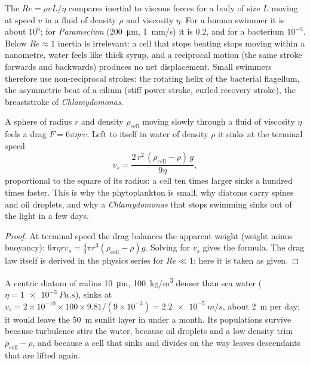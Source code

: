 \begin{proposition}\label{prop:b2:unicellular-diversity:reynolds}
The \emph{} $Re = \rho v L/\eta$ compares inertial to
viscous forces for a body of size $L$ moving at speed $v$ in a fluid
of density $\rho$ and viscosity $\eta$. For a human swimmer it is
about $10^6$; for \emph{Paramecium} (\qty{200}{\micro m},
\qty{1}{mm/s}) it is 0.2, and for a bacterium $10^{-5}$. Below
$Re \approx 1$ inertia is irrelevant: a cell that stops beating
stops moving within a nanometre, water feels like thick syrup, and a
reciprocal motion (the same stroke forwards and backwards) produces
no net displacement. Small swimmers therefore use non-reciprocal
strokes: the rotating helix of the bacterial flagellum, the
asymmetric beat of a cilium (stiff power stroke, curled recovery
stroke), the breaststroke of \emph{Chlamydomonas}.
\end{proposition}

\begin{theorem}\label{thm:b2:unicellular-diversity:stokes}
A sphere of radius $r$ and density $\rho_{\text{cell}}$ moving slowly
through a fluid of viscosity $\eta$ feels a drag $F = 6\pi\eta r v$.
Left to itself in water of density $\rho$ it sinks at the terminal
speed
\[
v_s = \frac{2\,r^2\,(\rho_{\text{cell}} - \rho)\,g}{9\eta},
\]
proportional to the square of its radius: a cell ten times larger
sinks a hundred times faster. This is why the phytoplankton is small,
why diatoms carry spines and oil droplets, and why a
\emph{Chlamydomonas} that stops swimming sinks out of the light in a
few days.
\end{theorem}
\begin{proof}
At terminal speed the drag balances the apparent weight (weight
minus buoyancy): $6\pi\eta r v_s = \tfrac{4}{3}\pi r^3
(\rho_{\text{cell}} - \rho) g$. Solving for $v_s$ gives the formula.
The drag law itself is derived in the physics series for
$Re \ll 1$; here it is taken as given.
\end{proof}

\begin{example}\label{ex:b2:unicellular-diversity:fall}
A centric diatom of radius \qty{10}{\micro m}, \qty{100}{kg/m^3}
denser than sea water ($\eta = \qty{1e-3}{Pa.s}$), sinks at
$v_s = 2\times 10^{-10}\times 100\times 9.81/(9\times 10^{-3}) =
\qty{2.2e-5}{m/s}$, about \qty{2}{m} per day: it would leave the
\qty{50}{m} sunlit layer in under a month. Its populations survive
because turbulence stirs the water, because oil droplets and a low
density trim $\rho_{\text{cell}} - \rho$, and because a cell that
sinks and divides on the way leaves descendants that are lifted
again.
\end{example}

